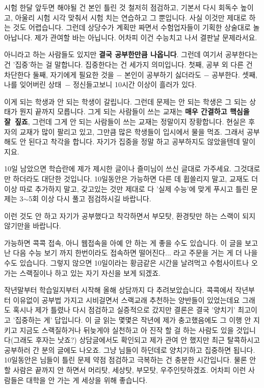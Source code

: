 시험 한달 앞두면 해야될 건 본인 틀린 것 철저히 점검하고, 기본서 다시 회독수 높이고,
아울리 시험 시각 맞춰서 시험 치는 연습하고 그 뿐입니다. 사실 이것만 제대로 하는 것도 어렵습니다.
그런데 상당수가 계획만 짜면서 수험업자들이 기획한 상술대로 놀아납니다.
제가 관여할 바는 아닙니다. 어차피 이건 수능치고 나서 결판날 문제라서요.
\vspace{5mm}

아니라고 하는 사람들도 있지만 \textbf{결국 공부한만큼 나옵니다}.
그런데 여기서 공부한다는 건 '집중'하는 걸 말합니다. 집중한다는 건 세가지 의미입니다.
첫째, 공부 외 다른 건 차단한다
둘째, 자기에게 필요한 것을 $-$ 본인이 공부하기 싫더라도 $-$ 공부한다.
셋째, 나를 잊어버린 상태 $-$ 정신들고보니 10시간 이상이 흘러가 있다.
\vspace{5mm}

이게 되는 학생과 안 되는 학생이 갈립니다. 그런데 문제는 안 되는 학생은 그 되는 상태가 뭔지 끝까지 모릅니다.
그게 되는 사람들이 쓰는 교재는 \textbf{매우 간결하고 핵심을 잘 짚죠}, 그런데 그게 안 되는 사람들이 쓰는 교재는 정말이지 장황합니다.
현실은 후자의 교재가 많이 팔리고 있고, 그만큼 많은 학생들이 입시에서 물을 먹죠.
그래서 공부해도 안 된다고 착각을 합니다. 자기가 집중을 정말 하고 공부하지도 않았을텐데 말이지요.
\vspace{5mm}

10일 남았으면 학습란에 제가 제시한 글이나 즐미님이 쓰신 글대로 가주세요. 그것대로만 하더라도 대단한 것입니다.
10일동안은 가능하면 다른 데 휩쓸리지 말고, 교재도 더 이상 따로 추가하지 말고, 갖고있는 것만 제대로 다 '실제 수능'에 맞게 푸시고
틀린 문제는 3$\sim$5회 이상 다시 풀고 점검하시길 바랍니다.
\vspace{5mm}

이런 것도 안 하고 자기가 공부했다고 착각하면서 부모탓, 환경탓만 하는 스랙이 되지 않기만을 바랍니다.
\vspace{5mm}

가능하면 콕콕 접속, 아니 웹접속을 아예 안 하는 게 좋을 수도 있습니다.
이 글을 보고 난 다음 수능 보기 까지 한번이라도 접속하면 떨어진다... 라고 주문을 거는 게 더 나을 수도 있습니다.
그렇지 않으면 10일이라는 황금같은 시간을 날려먹고 수험사이트나 오가는 스랙질이나 하고 있는 자기 자신을 보게 되겠죠.
\vspace{5mm}

작년말부터 학습일지부터 시작해 올해 상담까지 다 추려보았습니다.
콕콕에서 작년부터 이유없이 공부법 가지고 시비걸면서 스랙교래 추천하는 양반들이 있었는데요
그래도 혹시나 제가 틀렸나 다시 점검하고 실증적으로 갔지만 결론은 결국 '양치기' 최고이고 '집중하는 게' 답입니다.
이 글 읽는 몇몇은 작년에 제가 충고했음에도 그 이행 안 지키고 지금도 스랙질하거나
뒤늦게야 실천하고 아 진작 할 걸 하는 사람도 있을 것입니다(그래도 후자는 낫죠?)
상담글에서도 확인되고 제가 관여 안 했지만 최근 탈콕하시고 공부하러 간 분의 글에도 나오죠.
그냥 님들이 하던데로 양치기하고 집중하면 됩니다.
10일동안은 님들이 틀린 문제 약점 점검하고 극복하는 건 충분한 시간입니다.
물론 안 할 사람은 끝까지 안 하면서 머리탓, 세상탓, 부모탓, 우주인탓하겠죠. 어차피 이런 사람들은 대학을 안 가는 게 세상을 위해 좋습니다.
\vspace{5mm}

